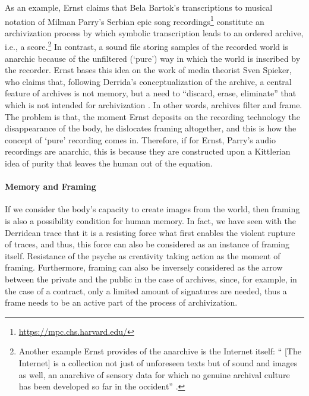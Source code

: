 As an example, Ernst claims that Bela Bartok's transcriptions to musical notation of Milman Parry's Serbian epic song recordings\footnote{\url{https://mpc.chs.harvard.edu/}} constitute an archivization process by which symbolic transcription leads to an ordered archive, i.e., a score.\footnote{Another example Ernst provides of the anarchive is the Internet itself: `` [The Internet] is a collection not just of unforeseen texts but of sound and images as well, an anarchive of sensory data for which no genuine archival culture has been developed so far in the occident'' \parencite[139]{Ern13:Dig}.} In contrast, a sound file storing samples of the recorded world is anarchic because of the unfiltered (`pure') way in which the world is inscribed by the recorder. Ernst bases this idea on the work of media theorist Sven Spieker, who claims that, following Derrida's conceptualization of the archive, a central feature of archives is not memory, but a need to ``discard, erase, eliminate'' that which is not intended for archivization \parencite[113]{Ern13:Dig}. In other words, archives filter and frame. 
%
The problem is that, the moment Ernst deposits on the recording technology the disappearance of the body, he dislocates framing altogether, and this is how the concept of `pure' recording comes in. Therefore, if for Ernst, Parry's audio recordings are anarchic, this is because they are constructed upon a Kittlerian idea of purity that leaves the human out of the equation.

\paragraph{Memory and Framing}
If we consider the body's capacity to create images from the world, then framing is also a possibility condition for human memory. 
%
In fact, we have seen with the Derridean trace that it is a resisting force what first enables the violent rupture of traces, and thus, this force can also be considered as an instance of framing itself. 
%
Resistance of the psyche as creativity taking action as the moment of framing. 
Furthermore, framing can also be inversely considered as the arrow between the private and the public in the case of archives, since, for example, in the case of a contract, only a limited amount of signatures are needed, thus a frame needs to be an active part of the process of archivization.



